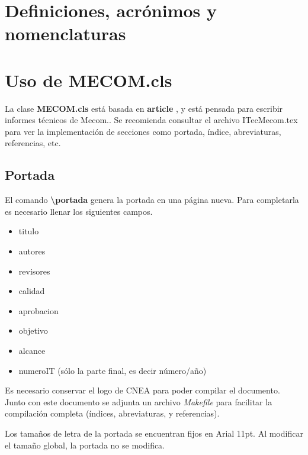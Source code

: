 \documentclass[a4paper,11pt,twoside]{MECOM}
\begin{document}
    \portada
    
    \tableofcontents    
    
    \section{Definiciones, acr\'onimos y nomenclaturas}
        \printnomenclature[2cm]
        
    \section{Uso de MECOM.cls}
    La clase {\bf MECOM.cls} est\'a basada en {\bf article} \cite{hefferon_minutes_2005}, y est\'a pensada para escribir informes t\'ecnicos de Mecom.. Se recomienda consultar el archivo ITec\textunderscore Mecom.tex para ver la implementaci\'on de secciones como portada, \'indice, abreviaturas, referencias, etc.
    
    \subsection{Portada}
        El comando {\bf \textbackslash portada} genera la portada en una p\'agina nueva. Para completarla es necesario llenar los siguientes campos.
        \begin{itemize}
            \item titulo
            \item autores
            \item revisores
            \item calidad
            \item aprobacion
            \item objetivo
            \item alcance
            \item numeroIT (s\'olo la parte final, es decir n\'umero/a\~no)
        \end{itemize}
        \par
        Es necesario conservar el logo de CNEA para poder compilar el documento. Junto con este documento se adjunta un archivo \emph{Makefile} para facilitar la compilaci\'on completa (\'indices, abreviaturas, y referencias).
        \par
        Los tama\~nos de letra de la portada se encuentran fijos en Arial 11pt. Al modificar el tama\~no global, la portada no se modifica.
        
\end{document}
